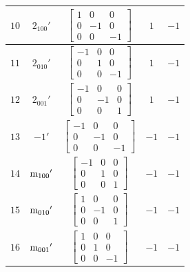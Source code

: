 \documentclass[fleqn,8pt]{jsarticle}
\begin{document}
\begin{longtable}{ccccc}
$ 10 $ & $ 2{}_{100}{}' $ & $ \begin{bmatrix} 1 & 0 & 0 \\ 0 & -1 & 0 \\ 0 & 0 & -1 \end{bmatrix} $ & $ 1 $ & $ -1 $ \\ \hline
$ 11 $ & $ 2{}_{010}{}' $ & $ \begin{bmatrix} -1 & 0 & 0 \\ 0 & 1 & 0 \\ 0 & 0 & -1 \end{bmatrix} $ & $ 1 $ & $ -1 $ \\ \hline
$ 12 $ & $ 2{}_{001}{}' $ & $ \begin{bmatrix} -1 & 0 & 0 \\ 0 & -1 & 0 \\ 0 & 0 & 1 \end{bmatrix} $ & $ 1 $ & $ -1 $ \\ \hline
$ 13 $ & $ -1{}' $ & $ \begin{bmatrix} -1 & 0 & 0 \\ 0 & -1 & 0 \\ 0 & 0 & -1 \end{bmatrix} $ & $ -1 $ & $ -1 $ \\ \hline
$ 14 $ & $ {\rm m}_{100}{}' $ & $ \begin{bmatrix} -1 & 0 & 0 \\ 0 & 1 & 0 \\ 0 & 0 & 1 \end{bmatrix} $ & $ -1 $ & $ -1 $ \\ \hline
$ 15 $ & $ {\rm m}_{010}{}' $ & $ \begin{bmatrix} 1 & 0 & 0 \\ 0 & -1 & 0 \\ 0 & 0 & 1 \end{bmatrix} $ & $ -1 $ & $ -1 $ \\ \hline
$ 16 $ & $ {\rm m}_{001}{}' $ & $ \begin{bmatrix} 1 & 0 & 0 \\ 0 & 1 & 0 \\ 0 & 0 & -1 \end{bmatrix} $ & $ -1 $ & $ -1 $ \\
\end{longtable}
\end{document}
